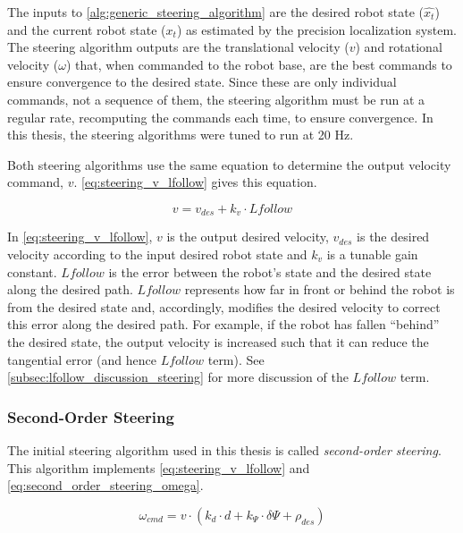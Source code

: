The inputs to \autoref{alg:generic_steering_algorithm} are the desired robot state ($\hat{x_t}$) and the current robot state ($x_t$) as estimated by the precision localization system. The steering algorithm outputs are the translational velocity ($v$) and rotational velocity ($\omega$) that, when commanded to the robot base, are the best commands to ensure convergence to the desired state. Since these are only individual commands, not a sequence of them, the steering algorithm must be run at a regular rate, recomputing the commands each time, to ensure convergence. In this thesis, the steering algorithms were tuned to run at 20 Hz.

Both steering algorithms use the same equation to determine the output velocity command, $v$. \eqref{eq:steering_v_lfollow} gives this equation.

\begin{equation}
v = v_{des} + k_v \cdot Lfollow
\label{eq:steering_v_lfollow}
\end{equation}

In \eqref{eq:steering_v_lfollow}, $v$ is the output desired velocity, $v_{des}$ is the desired velocity according to the input desired robot state and $k_v$ is a tunable gain constant. $Lfollow$ is the error between the robot's state and the desired state along the desired path. $Lfollow$ represents how far in front or behind the robot is from the desired state and, accordingly, modifies the desired velocity to correct this error along the desired path. For example, if the robot has fallen ``behind'' the desired state, the output velocity is increased such that it can reduce the tangential error (and hence $Lfollow$ term). See \autoref{subsec:lfollow_discussion_steering} for more discussion of the $Lfollow$ term.

\subsubsection{Second-Order Steering}\label{subsubsec:second_order_steering}

The initial steering algorithm used in this thesis is called \emph{second-order steering}. This algorithm implements \eqref{eq:steering_v_lfollow} and \eqref{eq:second_order_steering_omega}.

\begin{equation}
\omega_{cmd} = v \cdot \left(k_d \cdot d + k_{\Psi} \cdot \delta\Psi + \rho_{des}\right)
\label{eq:second_order_steering_omega}
\end{equation}

